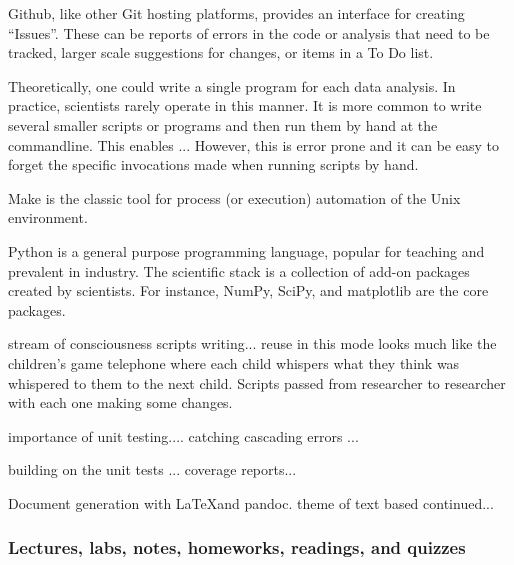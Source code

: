 Github, like other Git hosting platforms, provides an interface for creating
``Issues''.  These can be reports of errors in the code or analysis that need
to be tracked, larger scale suggestions for changes, or items in a To Do list.


Theoretically, one could write a single program for each data analysis.
In practice, scientists rarely operate in this manner.
It is more common to write several smaller scripts or programs
and then run them by hand at the commandline.
This enables ...
However, this is error prone and it can be easy to forget the specific
invocations made when running scripts by hand.

Make is the classic tool for process (or execution) automation of the Unix
environment.

Python is a general purpose programming language,
popular for teaching and prevalent in industry.
The scientific stack is a collection of add-on packages created by scientists.
For instance, NumPy, SciPy, and matplotlib are the core packages.

stream of consciousness scripts writing...
reuse in this mode looks much like
the children's game telephone where each child whispers what they
think was whispered to them to the next child.
Scripts passed from researcher to researcher with each one making some
changes.

importance of unit testing.... catching cascading errors ...

building on the unit tests ...
coverage reports...

Document generation with \LaTeX and pandoc.
theme of text based continued...

\subsubsection{Lectures, labs, notes, homeworks, readings, and quizzes}

